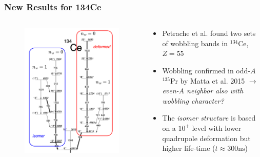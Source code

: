 \documentclass{beamer}
\begin{document}
\begin{frame}
  \frametitle{New Results for 134Ce}
\begin{columns}
  \begin{column}{0.4\textwidth}
    \begin{figure}
      \centering
      \includegraphics[scale=0.15]{Figs/triaxial-shapes-ce-134.png}
    \end{figure}
  \end{column}
  \begin{column}{0.6\textwidth}
    \begin{itemize}
      \item Petrache et al. found two sets of wobbling bands in $^{134}$Ce, $Z=55$
      \item Wobbling confirmed in odd-$A$ $^{135}$Pr by Matta et al. 2015 $\rightarrow$ \emph{even-$A$ neighbor also with wobbling character?}
      \item The \emph{isomer structure} is based on a $10^+$ level with lower quadrupole deformation but higher life-time ($t\approx 300 \text{ns}$)
    \end{itemize}
  \end{column}
\end{columns}
\end{frame}
\end{document}
